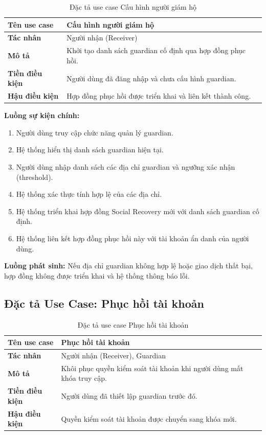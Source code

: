 \documentclass[../DoAn.tex]{subfiles}
\begin{document}
\begin{table}[H]
\centering
\caption{Đặc tả use case Cấu hình người giám hộ}
\begin{tabular}{|p{4cm}|p{10cm}|}
\hline
\textbf{Tên use case} & Cấu hình người giám hộ \\ \hline
\textbf{Tác nhân} & Người nhận (Receiver) \\ \hline
\textbf{Mô tả} & Khởi tạo danh sách guardian cố định qua hợp đồng phục hồi. \\ \hline
\textbf{Tiền điều kiện} & Người dùng đã đăng nhập và chưa cấu hình guardian. \\ \hline
\textbf{Hậu điều kiện} & Hợp đồng phục hồi được triển khai và liên kết thành công. \\ \hline
\end{tabular}
\end{table}

\textbf{Luồng sự kiện chính:}

\begin{enumerate}
    \item Người dùng truy cập chức năng quản lý guardian.
    \item Hệ thống hiển thị danh sách guardian hiện tại.
    \item Người dùng nhập danh sách các địa chỉ guardian và ngưỡng xác nhận (threshold).
    \item Hệ thống xác thực tính hợp lệ của các địa chỉ.
    \item Hệ thống triển khai hợp đồng Social Recovery mới với danh sách guardian cố định.
    \item Hệ thống liên kết hợp đồng phục hồi này với tài khoản ẩn danh của người dùng.
\end{enumerate}

\textbf{Luồng phát sinh:} Nếu địa chỉ guardian không hợp lệ hoặc giao dịch thất bại, hợp đồng không được triển khai và hệ thống thông báo lỗi.


\subsection{Đặc tả Use Case: Phục hồi tài khoản}

\begin{table}[H]
\centering
\caption{Đặc tả use case Phục hồi tài khoản}
\begin{tabular}{|p{4cm}|p{10cm}|}
\hline
\textbf{Tên use case} & Phục hồi tài khoản \\ \hline
\textbf{Tác nhân} & Người nhận (Receiver), Guardian \\ \hline
\textbf{Mô tả} & Khôi phục quyền kiểm soát tài khoản khi người dùng mất khóa truy cập. \\ \hline
\textbf{Tiền điều kiện} & Người dùng đã thiết lập guardian trước đó. \\ \hline
\textbf{Hậu điều kiện} & Quyền kiểm soát tài khoản được chuyển sang khóa mới. \\ \hline
\end{tabular}
\end{table}
\end{document}
